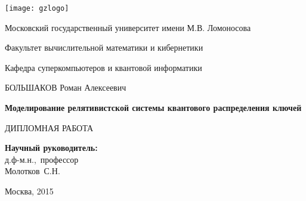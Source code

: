 
\begin{titlepage}
  \small{
      \centerline{\texttt{[image: gzlogo]}}
      \centerline{Московский государственный университет имени М.В. Ломоносова}
      \centerline{Факультет вычислительной математики и кибернетики}
      \centerline{Кафедра суперкомпьютеров и квантовой информатики}
    }
  \centerline{\hfill\hrulefill\hrulefill\hfill}
  \vfill
  \vfill
  \vfill
  \large
  \centerline{\MakeUppercase{Большаков} Роман Алексеевич}
  \vfill
  \Large
  \begin{center}
  {\bf{Моделирование релятивистской системы квантового распределения ключей}}
  \end{center}
  \normalsize
  \vfill
  \vfill
  \centerline{\MakeUppercase{Дипломная работа}}
  \vfill
  \vfill
  \begin{flushright}
  \textbf{Научный руководитель:}\\
  д.ф-м.н.,~профессор\\
  Молотков~С.Н.
  \end{flushright}
  \vfill
  \vfill
  \centerline{Москва, 2015}
  \end{titlepage}


